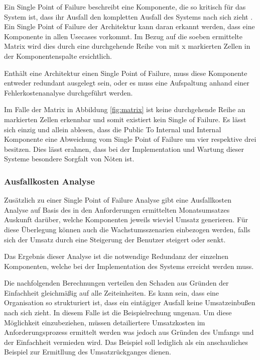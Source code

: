 Ein Single Point of Failure beschreibt eine Komponente, die so kritisch für das System ist, dass ihr Ausfall den kompletten Ausfall des Systems nach sich zieht \cite[S. 3]{single}. Ein Single Point of Failure der Architektur kann daran erkannt werden, dass eine Komponente in allen Usecases vorkommt. Im Bezug auf die soeben ermittelte Matrix wird dies durch eine durchgehende Reihe von mit x markierten Zellen in der Komponentenspalte ersichtlich.

Enthält eine Architektur einen Single Point of Failure, muss diese Komponente entweder redundant ausgelegt sein, oder es muss eine Aufspaltung anhand einer Fehlerkostenanalyse durchgeführt werden.

Im Falle der Matrix in Abbildung \ref{fig:matrix} ist keine durchgehende Reihe an markierten Zellen erkennbar und somit existiert kein Single of Failure. Es lässt sich einzig und allein ablesen, dass die Public To Internal und Internal Komponente eine Abweichung vom Single Point of Failure um vier respektive drei besitzen. Dies lässt erahnen, dass bei der Implementation und Wartung dieser Systeme besondere Sorgfalt von Nöten ist.

\subsubsection{Ausfallkosten Analyse}
Zusätzlich zu einer Single Point of Failure Analyse gibt eine Ausfallkosten Analyse auf Basis des in den Anforderungen ermittelten Monatsumsatzes Auskunft darüber, welche Komponenten jeweils wieviel Umsatz generieren. Für diese Überlegung können auch die Wachstumsszenarien einbezogen werden, falls sich der Umsatz durch eine Steigerung der Benutzer steigert oder senkt.

Das Ergebnis dieser Analyse ist die notwendige Redundanz der einzelnen Komponenten, welche bei der Implementation des Systems erreicht werden muss.

Die nachfolgenden Berechnungen verteilen den Schaden aus Gründen der Einfachheit gleichmäßig auf alle Zeiteinheiten. Es kann sein, dass eine Organisation so strukturiert ist, dass ein eintägiger Ausfall keine Umsatzeinbußen nach sich zieht. In diesem Falle ist die Beispielrechung ungenau. Um diese Möglichkeit einzubeziehen, müssen detailiertere Umsatzkosten im Anforderungsprozess ermittelt werden was jedoch aus Gründen des Umfangs und der Einfachheit vermieden wird. Das Beispiel soll lediglich als ein anschauliches Beispiel zur Ermitllung des Umsatzrückganges dienen.

